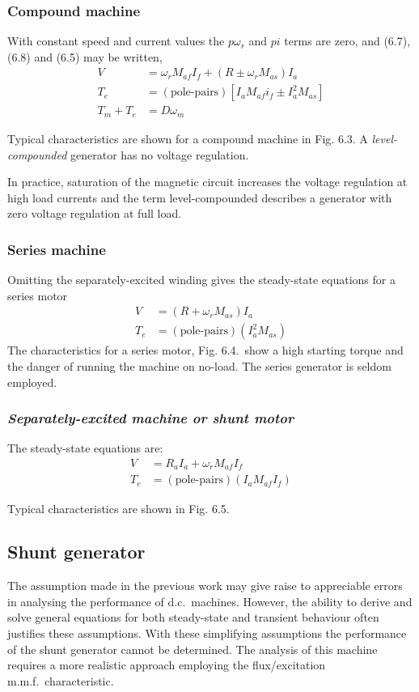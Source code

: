 \documentclass[a4paper,numbers=noenddot,12pt]{scrbook}
\begin{document}
\subsubsection{Compound machine} With constant speed and current values the $p \omega_r$ and $p i$ terms are zero, and (6.7), (6.8) and (6.5) may be written,
\begin{align}
    V & =\omega_r M_{af} I_f + (R \pm \omega_r M_{as}) I_a \\[2ex]
    T_e & = (\text{pole-pairs})[I_a M_{af} i_f \pm I_a^2 M_{as}] \\[2ex]
    T_m + T_e & = D \omega_m
\end{align}

Typical characteristics are shown for a compound machine in Fig. 6.3. A \textit{level-compounded} generator has  no voltage regulation.

\noindent In practice, saturation of the magnetic circuit increases the voltage regulation at high load currents and the term level-compounded describes a generator with zero voltage regulation at full load.

\subsubsection{Series machine} Omitting the separately-excited winding gives the steady-state equations for a series motor
\begin{align}
    V & = (R + \omega_r M_{as}) I_a\\[2ex]
    T_e & = (\text{pole-pairs})(I_a^2 M_{as})
    \label{}
\end{align}
The characteristics for a series motor, Fig. 6.4.\ show a high starting torque and the danger of running the machine on no-load. The series generator is seldom employed.

\subsubsection{\itshape\/Separately-excited machine or shunt motor} The steady-state equations are:
\begin{align}
    V & = R_a I_a + \omega_r M_{af} I_f\\[2ex]
    T_e & = (\text{pole-pairs})(I_a M_{af} I_f)
    \label{}
    \label{}
\end{align}

Typical characteristics are shown in Fig. 6.5.

\subsection{Shunt generator} The assumption made in the previous work may give raise to appreciable errors in analysing the performance of d.c.\ machines. However, the ability to derive and solve general equations for both steady-state and transient behaviour often justifies these assumptions. With these simplifying assumptions the performance of the shunt generator cannot be determined. The analysis of this machine requires a more realistic approach employing the
flux/excitation m.m.f.\ characteristic.
\end{document}
